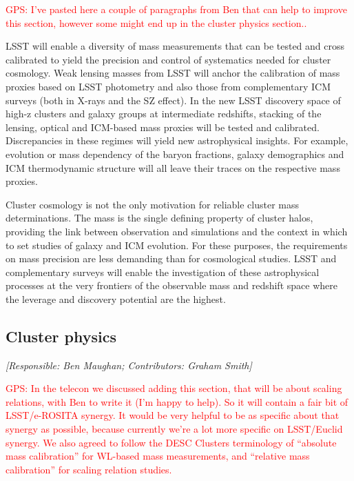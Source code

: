 \documentclass[a4paper,11pt]{article}
\newcommand{\red}{\textcolor{red}}
\begin{document}
\red{GPS: I've pasted here a couple of paragraphs from Ben that can
  help to improve this section, however some might end up in the
  cluster physics section..}

LSST will enable a diversity of mass measurements that can be tested
and cross calibrated to yield the precision and control of systematics
needed for cluster cosmology. Weak lensing masses from LSST will
anchor the calibration of mass proxies based on LSST photometry and
also those from complementary ICM surveys (both in X-rays and the SZ
effect). In the new LSST discovery space of high-z clusters and galaxy
groups at intermediate redshifts, stacking of the lensing, optical and
ICM-based mass proxies will be tested and calibrated. Discrepancies in
these regimes will yield new astrophysical insights. For example,
evolution or mass dependency of the baryon fractions, galaxy
demographics and ICM thermodynamic structure will all leave their
traces on the respective mass proxies.

Cluster cosmology is not the only motivation for reliable cluster mass
determinations. The mass is the single defining property of cluster
halos, providing the link between observation and simulations and the
context in which to set studies of galaxy and ICM evolution. For these
purposes, the requirements on mass precision are less demanding than
for cosmological studies. LSST and complementary surveys will enable
the investigation of these astrophysical processes at the very
frontiers of the observable mass and redshift space where the leverage
and discovery potential are the highest.

\subsection{Cluster physics}\label{sec:physics}

{\it [Responsible: Ben Maughan; Contributors: Graham Smith]}

\noindent\red{GPS: In the telecon we discussed adding this section,
  that will be about scaling relations, with Ben to write it (I'm
  happy to help).  So it will contain a fair bit of LSST/e-ROSITA
  synergy.  It would be very helpful to be as specific about that
  synergy as possible, because currently we're a lot more specific on
  LSST/Euclid synergy.  We also agreed to follow the DESC Clusters
  terminology of ``absolute mass calibration'' for WL-based mass
  measurements, and ``relative mass calibration'' for scaling relation
  studies.}
\end{document}
